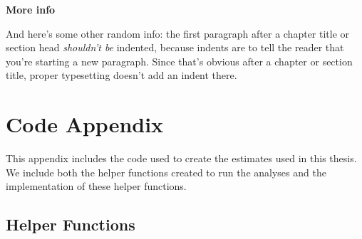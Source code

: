 \documentclass[12pt,twoside]{reedthesis}
\begin{document}
\textbf{More info}

And here's some other random info: the first paragraph after a chapter title or section head \emph{shouldn't be} indented, because indents are to tell the reader that you're starting a new paragraph. Since that's obvious after a chapter or section title, proper typesetting doesn't add an indent there.

\appendix

\hypertarget{code-appendix}{%
\chapter{Code Appendix}\label{code-appendix}}

This appendix includes the code used to create the estimates used in this thesis. We include both the helper functions created to run the analyses and the implementation of these helper functions.

\hypertarget{helper-functions}{%
\section{Helper Functions}\label{helper-functions}}
\end{document}
